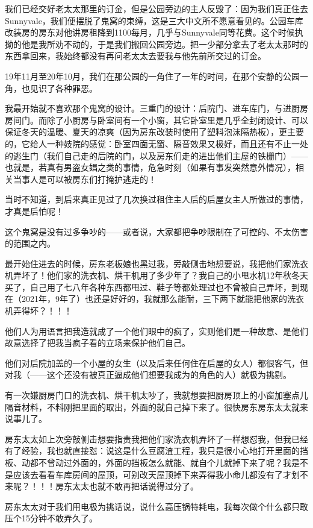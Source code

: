 \documentclass[9pt, b5paper]{article}
\begin{document}
我们已经交好老太太那里的订金，但是公园旁边的主人反毁了：因为我们真正住去Sunnyvale，我们便摆脱了鬼窝的束缚，这是三大中文所不愿意看见的。公园车库改装房的房东对他讲房租降到1100每月，几乎与Sunnyvale同等花费。这个时候执拗的他是我所劝不动的，于是我们搬回公园旁边。把一少部分拿去了老太太那时的东西拿回来，我始终都没有再问老太太去要我与他先前所交过的订金。

19年11月至20年10月，我们在那公园的一角住了一年的时间，在那个安静的公园一角，也见识了各种罪恶。 

我最开始就不喜欢那个鬼窝的设计。三重门的设计：后院门、进车库门，与进厨房房间门。而除了小厨房与卧室间有一个小窗，其它卧室里是几乎全封闭设计、可以保证冬天的温暖、夏天的凉爽（因为房东改装时使用了塑料泡沫隔热板），更主要的，它给人一种妓院的感觉：卧室四面无窗、隔音效果又极好，而且还有不止一处的逃生门（我们自己走的后院的门，以及房东们走的进出他们主屋的铁栅门）——也就是，若真有男盗女娼之类的事情，危急时刻（如果有事发突然意外情况），相关当事人是可以被房东们打掩护逃走的！

当时不知道，到后来真正见过了几次换过租住主人后的后屋女主人所做过的事情，才真是后怕呢！

这个鬼窝是没有过多争吵的——或者说，大家都把争吵限制在了可控的、不太伤害的范围之内。 

最开始住进去的时候，房东老板娘也黑过我，旁敲侧击地想要说，我把他们家洗衣机弄坏了！他们家的洗衣机、烘干机用了多少年了？我自己的小甩水机12年秋冬天买了，自己用了七八年各种东西都甩过、鞋子等都处理过也不曾被自己弄坏，到现在（2021年，9年了）也还是好好的，我就那么能耐，三下两下就能把他家的洗衣机弄得坏？！！！

他们人为用语言把我造就成了一个他们眼中的疯了，实则他们是一种故意、是他们故意选择了把我当疯子看的立场来保护他们自己。 

他们对后院加盖的一个小屋的女生（以及后来任何住在后屋的女人）都很客气，但对我（——这个还没有被真正逼成他们想要我成为的角色的人）就极为挑剔。

有一次嫌厨房门口的洗衣机、烘干机太吵了，我就想要把厨房顶上的小窗加塞点儿隔音材料，不料刚把里面的取出，外面的就自己掉下来了。很快房东房东太太就来说事儿了。

房东太太如上次旁敲侧击想要指责我把他们家洗衣机弄坏了一样想怼我，但我已经有了经验，我也就直接怼：说这是什么豆腐渣工程，我只是很小心地打开里面的挡板、动都不曾动过外面的，外面的挡板怎么就能、就自个儿就掉下来了呢？我是不是应该去看看车库房间的屋顶，可别改天屋顶掉下来弄得我小命儿都没有了才划不来呢？！！！房东太太也就不敢再把话说得过分了。 

房东太太对于我们用电极为挑话说，说什么高压锅特耗电，我每次做个什么都只敢压个15分钟不敢弄久了。
\end{document}
